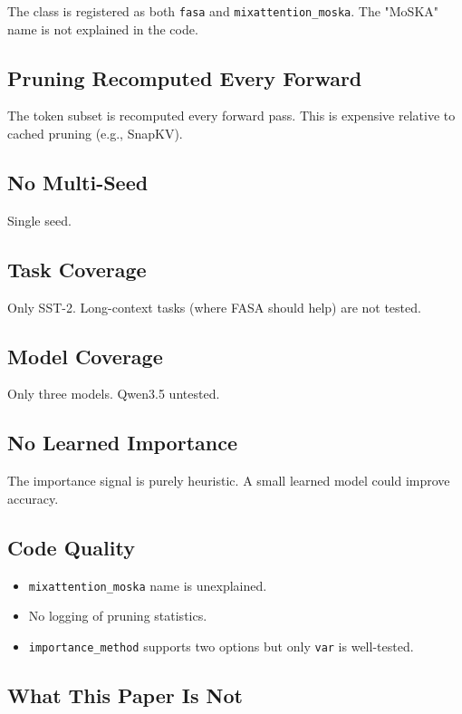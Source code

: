 The class is registered as both \texttt{fasa} and \texttt{mixattention\_moska}. The 
"MoSKA" name is not explained in the code.

\subsection{Pruning Recomputed Every Forward}

The token subset is recomputed every forward pass. This is expensive 
relative to cached pruning (e.g., SnapKV).

\subsection{No Multi-Seed}

Single seed.

\subsection{Task Coverage}

Only SST-2. Long-context tasks (where FASA should help) are not tested.

\subsection{Model Coverage}

Only three models. Qwen3.5 untested.

\subsection{No Learned Importance}

The importance signal is purely heuristic. A small learned model could 
improve accuracy.

\subsection{Code Quality}

\begin{itemize}
\item \texttt{mixattention\_moska} name is unexplained.
\item No logging of pruning statistics.
\item \texttt{importance\_method} supports two options but only \texttt{var} is well-tested.

\end{itemize}
\subsection{What This Paper Is Not}

